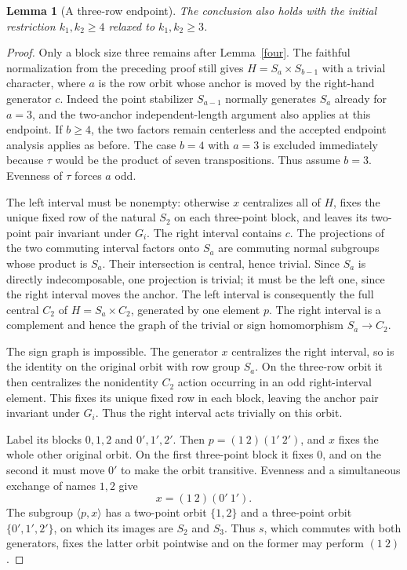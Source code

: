\documentclass[11pt,a4paper]{article}
\newtheorem{lemma}{Lemma}
\newcommand{\gen}[1]{\langle#1\rangle}
\begin{document}
\begin{lemma}[A three-row endpoint]\label{three}
The conclusion also holds with the initial restriction
$k_1,k_2\geq4$ relaxed to $k_1,k_2\geq3$.
\end{lemma}
\begin{proof}
Only a block size three remains after Lemma~\ref{four}.
The faithful normalization from the preceding proof still
gives $H=S_a\times S_{b-1}$ with a trivial character, where
$a$ is the row orbit whose anchor is moved by the right-hand
generator $c$. Indeed the point stabilizer $S_{a-1}$ normally
generates $S_a$ already for $a=3$, and the two-anchor
independent-length argument also applies at this endpoint.
If $b\geq4$, the two factors remain centerless and the
accepted endpoint analysis applies as before. The case $b=4$
with $a=3$ is excluded immediately because $\tau$ would
be the product of seven transpositions. Thus assume $b=3$.
Evenness of $\tau$ forces $a$ odd.

The left interval must be nonempty: otherwise $x$ centralizes
all of $H$, fixes the unique fixed row of the natural $S_2$
on each three-point block, and leaves its two-point pair
invariant under $G_i$. The right interval contains $c$.
The projections of the two commuting interval factors onto
$S_a$ are commuting normal subgroups whose product is $S_a$.
Their intersection is central, hence trivial. Since $S_a$
is directly indecomposable, one projection is trivial; it
must be the left one, since the right interval moves the
anchor. The left interval is consequently the full central
$C_2$ of $H=S_a\times C_2$, generated by one element $p$.
The right interval is a complement and hence the graph of
the trivial or sign homomorphism $S_a\to C_2$.

The sign graph is impossible. The generator $x$ centralizes
the right interval, so is the identity on the original orbit
with row group $S_a$. On the three-row orbit it then
centralizes the nonidentity $C_2$ action occurring in an odd
right-interval element. This fixes its unique fixed row in
each block, leaving the anchor pair invariant under $G_i$.
Thus the right interval acts trivially on this orbit.

Label its blocks $0,1,2$ and $0',1',2'$. Then
$p=(1\ 2)(1'\ 2')$, and $x$ fixes the whole other original
orbit. On the first three-point block it fixes $0$, and on
the second it must move $0'$ to make the orbit transitive.
Evenness and a simultaneous exchange of names $1,2$ give
\[
 x=(1\ 2)(0'\ 1').                                      \tag{4}
\]
The subgroup $\gen{p,x}$ has a two-point orbit $\{1,2\}$
and a three-point orbit $\{0',1',2'\}$, on which its images
are $S_2$ and $S_3$. Thus $s$, which commutes with both
generators, fixes the latter orbit pointwise and on the former
may perform $(1\ 2)$.


\end{proof}
\end{document}

